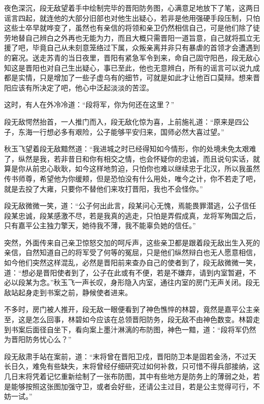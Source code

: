 夜色深沉，段无敌望着手中绘制完毕的晋阳防务图，心满意足地放下了笔，这两日谣言四起，就连他的大部分旧部也对他生出疑心，若非是他用强硬手段压制，只怕这些士卒早就哗变了，虽然也有亲信的将领和亲卫仍然相信自己，可是他们除了徒劳地替自己辨白之外再也无能为力，而且大概只需晋阳一道旨意，自己就将孤立无援了吧，毕竟自己从未刻意笼络过下属，众叛亲离并非只有暴虐的首领才会遭遇到的窘况。送走苏青的当日夜里，晋阳有紧急军令到来，命自己固守阳邑，段无敌心知这是晋阳也对自己生出疑心，事已至此，他也无意辨白，所有的谣言可以说九成都是实情，只是增加了一些子虚乌有的细节，可就是如此才让他百口莫辩。想来晋阳应该有所决定了吧，他心中泛起淡淡的苦涩。

这时，有人在外冷冷道：“段将军，你为何还在这里？”

段无敌愕然抬首，一人推门而入，段无敌化惊为喜，上前施礼道：“原来是四公子，东海一行想必多有艰险，公子能够平安归来，国师必然大喜过望。”

秋玉飞望着段无敌黯然道：“我进城之时已经得知如今情形，你的处境未免太艰难了，纵然是我，若非昔日和你有相交之情，也会怀疑你的忠诚，而且说句实话，就算是你从前忠心耿耿，如今这样地剪迫，只怕你也难以继续忠于北汉，所以我虽然传书师尊，希望他为你缓颊，但是恐怕没有什么用处，唯今之计，你不若走了吧，就是去投了大雍，只要你不替他们来攻打晋阳，我也不会怪你。”

段无敌微微一笑，道：“公子何出此言，段某问心无愧，焉能畏罪潜逃，公子信任段某忠诚，段某感激不尽，若是我真的逃走，只怕是弄假成真，龙将军殉国之后，只有嘉平公主独力擎天，她待我不薄，我不能辜负她的信任。”

突然，外面传来自己亲卫惊怒交加的呵斥声，这些亲卫都是跟着段无敌出生入死的亲信，自然知道自己的将军受了何等的冤屈，只是他们纵然辩白也无人愿意相信，如今他们突然这样混乱，必然是晋阳前来查办自己的使者到了，段无敌微微一笑，道：“想必是晋阳使者到了，公子在此或有不便，若是不嫌弃，请到内室暂避，不必以段某为念。”秋玉飞一声长叹，身形隐入内室，通往内室的房门无声关闭。段无敌站起身走到书案之前，静候使者进来。

不多时，房门被人推开，段无敌一眼便看到了神色憔悴的林碧，竟然是嘉平公主亲至，这是怎么回事，林碧如今应该在总领晋阳防务，段无敌不由神色数变。林碧走到书案后面径自坐下，看向案上墨汁淋漓的布防图，神色一黯，道：“段将军仍然为晋阳防务忧心么？”

段无敌肃手站在案前，道：“末将曾在晋阳卫戍，晋阳防卫本是固若金汤，不过天长日久，难免有些缺失，末将曾经仔细研究过如何补救，只可惜不得兵部接纳，这几日末将凭着记忆重新绘制了一张布防图，其中有些地方是防务上的薄弱之处，若是能够按照这张图加强守卫，或者会好些，还请公主过目，若是公主觉得可行，不妨一试。”

